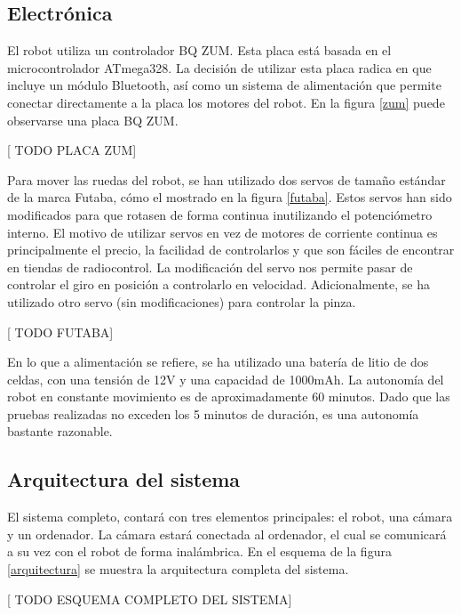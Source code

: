 \subsection{Electrónica}

El robot utiliza un controlador BQ ZUM. Esta placa está basada en el microcontrolador ATmega328. La decisión de utilizar esta placa radica en que incluye un módulo Bluetooth, así como un sistema de alimentación que permite conectar directamente a la placa los motores del robot. En la figura \ref{zum} puede observarse una placa BQ ZUM.

[ TODO PLACA ZUM]

Para mover las ruedas del robot, se han utilizado dos servos de tamaño estándar de la marca Futaba, cómo el mostrado en la figura \ref{futaba}. Estos servos han sido modificados para que rotasen de forma continua inutilizando el potenciómetro interno. El motivo de utilizar servos en vez de motores de corriente continua es principalmente el precio, la facilidad de controlarlos y que son fáciles de encontrar en tiendas de radiocontrol. La modificación del servo nos permite pasar de controlar el giro en posición a controlarlo en velocidad. Adicionalmente, se ha utilizado otro servo (sin modificaciones) para controlar la pinza.

[ TODO FUTABA]

En lo que a alimentación se refiere, se ha utilizado una batería de litio de dos celdas, con una tensión de 12V y una capacidad de 1000mAh. La autonomía del robot en constante movimiento es de aproximadamente 60 minutos. Dado que las pruebas realizadas no exceden los 5 minutos de duración, es una autonomía bastante razonable.

\subsection{Arquitectura del sistema}

El sistema completo, contará con tres elementos principales: el robot, una cámara y un ordenador. La cámara estará conectada al ordenador, el cual se comunicará a su vez con el robot de forma inalámbrica. En el esquema de la figura \ref{arquitectura} se muestra la arquitectura completa del sistema.

[ TODO ESQUEMA COMPLETO DEL SISTEMA]